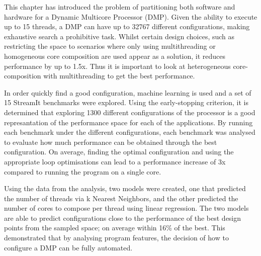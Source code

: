 This chapter has introduced the problem of partitioning both software and hardware for a Dynamic Multicore Processor (DMP).
Given the ability to execute up to 15 threads, a DMP can have up to 32767 different configurations, making exhaustive search a prohibitive task.
Whilst certain design choices, such as restricting the space to scenarios where only using multithreading or homogeneous core composition are used appear as a solution, it reduces performance by up to 1.5x.
Thus it is important to look at heterogeneous core-composition with multithreading to get the best performance.

In order quickly find a good configuration, machine learning is used and a set of 15 StreamIt benchmarks were explored.
Using the early-stopping criterion, it is determined that exploring 1300 different configurations of the processor is a good represantation of the performance space for each of the applications.
By running each benchmark under the different configurations, each benchmark was analysed to evaluate how much performance can be obtained through the best configuration.
On average, finding the optimal configuration and using the appropriate loop optimisations can lead to a performance increase of 3x compared to running the program on a single core.

Using the data from the analysis, two models were created, one that predicted the number of threads via k Nearest Neighbors, and the other predicted the number of cores to compose per thread using linear regression.
The two models are able to predict configurations close to the performance of the best design points from the sampled space; on average within 16\% of the best.
This demonstrated that by analysing program features, the decision of how to configure a DMP can be fully automated.

